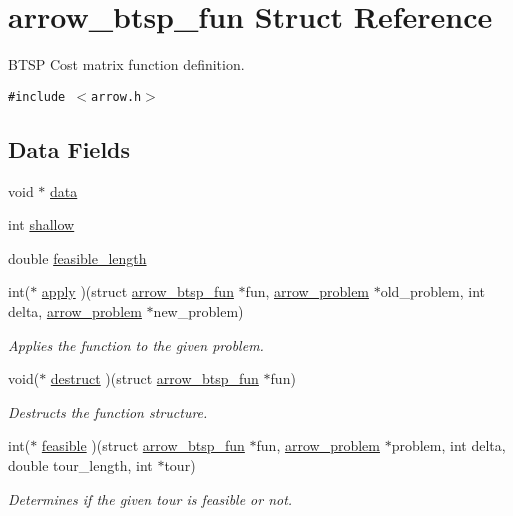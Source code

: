 \hypertarget{structarrow__btsp__fun}{
\section{arrow\_\-btsp\_\-fun Struct Reference}
\label{structarrow__btsp__fun}
}
BTSP Cost matrix function definition.  


{\tt \#include $<$arrow.h$>$}

\subsection*{Data Fields}
\begin{CompactItemize}
\item 
void $\ast$ \hyperlink{structarrow__btsp__fun_9c1a276685fb0cac372faef2dd2ba99a}{data}
\item 
int \hyperlink{structarrow__btsp__fun_1950686e4862a4b1bd68d1ada85e2c79}{shallow}
\item 
double \hyperlink{structarrow__btsp__fun_bc871d7af05237e477a340eff4eeda9f}{feasible\_\-length}
\item 
int($\ast$ \hyperlink{structarrow__btsp__fun_7736b2d3059ece3dc94433af0763b47a}{apply} )(struct \hyperlink{structarrow__btsp__fun}{arrow\_\-btsp\_\-fun} $\ast$fun, \hyperlink{structarrow__problem}{arrow\_\-problem} $\ast$old\_\-problem, int delta, \hyperlink{structarrow__problem}{arrow\_\-problem} $\ast$new\_\-problem)
\begin{CompactList}\small\item\em Applies the function to the given problem. \item\end{CompactList}\item 
void($\ast$ \hyperlink{structarrow__btsp__fun_6c66b7591252728aaa441139c623446a}{destruct} )(struct \hyperlink{structarrow__btsp__fun}{arrow\_\-btsp\_\-fun} $\ast$fun)
\begin{CompactList}\small\item\em Destructs the function structure. \item\end{CompactList}\item 
int($\ast$ \hyperlink{structarrow__btsp__fun_a64a29d588b40b0d04db43e23a22d1a9}{feasible} )(struct \hyperlink{structarrow__btsp__fun}{arrow\_\-btsp\_\-fun} $\ast$fun, \hyperlink{structarrow__problem}{arrow\_\-problem} $\ast$problem, int delta, double tour\_\-length, int $\ast$tour)
\begin{CompactList}\small\item\em Determines if the given tour is feasible or not. \item\end{CompactList}\end{CompactItemize}


